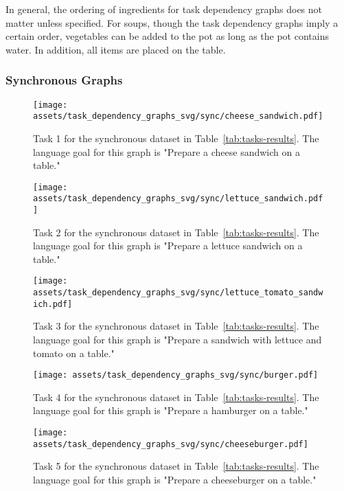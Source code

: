 In general, the ordering of ingredients for task dependency graphs does not matter unless specified. For soups, though the task dependency graphs imply a certain order, vegetables can be added to the pot as long as the pot contains water. In addition, all items are placed on the table.

\subsubsection{Synchronous Graphs}
\begin{figure}[H]
    \centering
    \texttt{[image: assets/task\_dependency\_graphs\_svg/sync/cheese\_sandwich.pdf]}
    \caption{Task 1 for the synchronous dataset in Table~\ref{tab:tasks-results}. The language goal for this graph is "Prepare a cheese sandwich on a table."}
    \label{fig:0_sync}
\end{figure}

\begin{figure}[H]
    \centering
    \texttt{[image: assets/task\_dependency\_graphs\_svg/sync/lettuce\_sandwich.pdf]}
    \caption{Task 2 for the synchronous dataset in Table~\ref{tab:tasks-results}. The language goal for this graph is "Prepare a lettuce sandwich on a table."}
    \label{fig:1_sync}
\end{figure}

\begin{figure}[H]
    \centering
    \texttt{[image: assets/task\_dependency\_graphs\_svg/sync/lettuce\_tomato\_sandwich.pdf]}
    \caption{Task 3 for the synchronous dataset in Table~\ref{tab:tasks-results}. The language goal for this graph is "Prepare a sandwich with lettuce and tomato on a table."}
    \label{fig:2_sync}
\end{figure}

\begin{figure}[H]
    \centering
    \texttt{[image: assets/task\_dependency\_graphs\_svg/sync/burger.pdf]}
    \caption{Task 4 for the synchronous dataset in Table~\ref{tab:tasks-results}. The language goal for this graph is "Prepare a hamburger on a table."}
    \label{fig:3_sync}
\end{figure}

\begin{figure}[H]
    \centering
    \texttt{[image: assets/task\_dependency\_graphs\_svg/sync/cheeseburger.pdf]}
    \caption{Task 5 for the synchronous dataset in Table~\ref{tab:tasks-results}. The language goal for this graph is "Prepare a cheeseburger on a table."}
    \label{fig:4_sync}
\end{figure}

